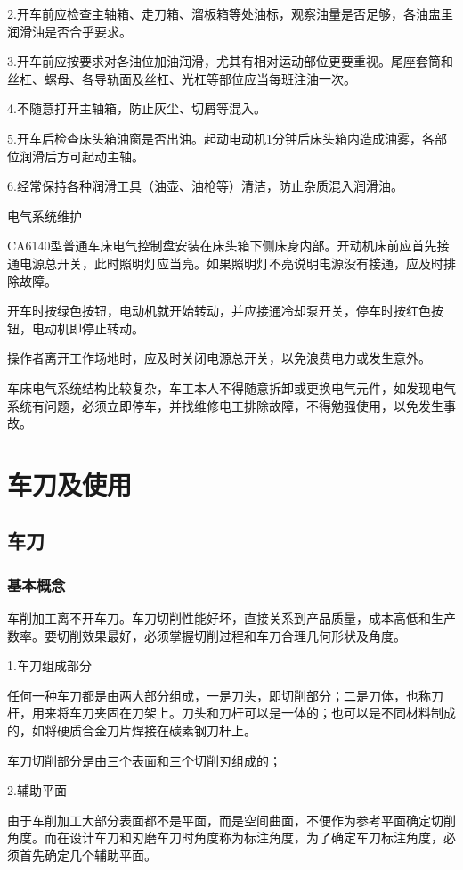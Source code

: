 \documentclass{ctexbook}
\begin{document}
2.开车前应检查主轴箱、走刀箱、溜板箱等处油标，观察油量是否足够，各油盅里润滑油是否合乎要求。

3.开车前应按要求对各油位加油润滑，尤其有相对运动部位更要重视。尾座套筒和丝杠、螺母、各导轨面及丝杠、光杠等部位应当每班注油一次。

4.不随意打开主轴箱，防止灰尘、切屑等混入。

5.开车后检查床头箱油窗是否出油。起动电动机1分钟后床头箱内造成油雾，各部位润滑后方可起动主轴。

6.经常保持各种润滑工具（油壶、油枪等）清洁，防止杂质混入润滑油。

电气系统维护

CA6140型普通车床电气控制盘安装在床头箱下侧床身内部。开动机床前应首先接通电源总开关，此时照明灯应当亮。如果照明灯不亮说明电源没有接通，应及时排除故障。

开车时按绿色按钮，电动机就开始转动，并应接通冷却泵开关，停车时按红色按钮，电动机即停止转动。

操作者离开工作场地时，应及时关闭电源总开关，以免浪费电力或发生意外。

车床电气系统结构比较复杂，车工本人不得随意拆卸或更换电气元件，如发现电气系统有问题，必须立即停车，并找维修电工排除故障，不得勉强使用，以免发生事故。

\section{车刀及使用}
\subsection{车刀}
\subsubsection{基本概念}
车削加工离不开车刀。车刀切削性能好坏，直接关系到产品质量，成本高低和生产数率。要切削效果最好，必须掌握切削过程和车刀合理几何形状及角度。

1.车刀组成部分

任何一种车刀都是由两大部分组成，一是刀头，即切削部分；二是刀体，也称刀杆，用来将车刀夹固在刀架上。刀头和刀杆可以是一体的；也可以是不同材料制成的，如将硬质合金刀片焊接在碳素钢刀杆上。

车刀切削部分是由三个表面和三个切削刃组成的；

2.辅助平面

由于车削加工大部分表面都不是平面，而是空间曲面，不便作为参考平面确定切削角度。而在设计车刀和刃磨车刀时角度称为标注角度，为了确定车刀标注角度，必须首先确定几个辅助平面。
\end{document}

